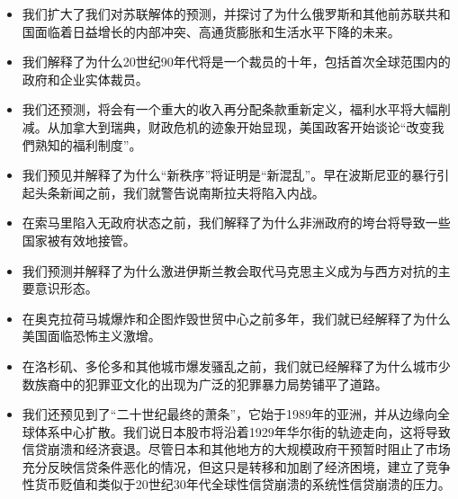 \begin{paracol}{2}
\switchcolumn*
\begin{itemize}
    \item 我们扩大了我们对苏联解体的预测，并探讨了为什么俄罗斯和其他前苏联共和国面临着日益增长的内部冲突、高通货膨胀和生活水平下降的未来。
    \item 我们解释了为什么20世纪90年代将是一个裁员的十年，包括首次全球范围内的政府和企业实体裁员。
    \item 我们还预测，将会有一个重大的收入再分配条款重新定义，福利水平将大幅削减。从加拿大到瑞典，财政危机的迹象开始显现，美国政客开始谈论“改变我們熟知的福利制度”。
    \item 我们预见并解释了为什么“新秩序”将证明是“新混乱”。早在波斯尼亚的暴行引起头条新闻之前，我们就警告说南斯拉夫将陷入内战。
    \item 在索马里陷入无政府状态之前，我们解释了为什么非洲政府的垮台将导致一些国家被有效地接管。
    \item 我们预测并解释了为什么激进伊斯兰教会取代马克思主义成为与西方对抗的主要意识形态。
    \item 在奥克拉荷马城爆炸和企图炸毁世贸中心之前多年，我们就已经解释了为什么美国面临恐怖主义激增。
    \item 在洛杉矶、多伦多和其他城市爆发骚乱之前，我们就已经解释了为什么城市少数族裔中的犯罪亚文化的出现为广泛的犯罪暴力局势铺平了道路。
    \item 我们还预见到了“二十世纪最终的萧条”，它始于1989年的亚洲，并从边缘向全球体系中心扩散。我们说日本股市将沿着1929年华尔街的轨迹走向，这将导致信贷崩溃和经济衰退。尽管日本和其他地方的大规模政府干预暂时阻止了市场充分反映信贷条件恶化的情况，但这只是转移和加剧了经济困境，建立了竞争性货币贬值和类似于20世纪30年代全球性信贷崩溃的系统性信贷崩溃的压力。
\end{itemize}


\end{paracol}

